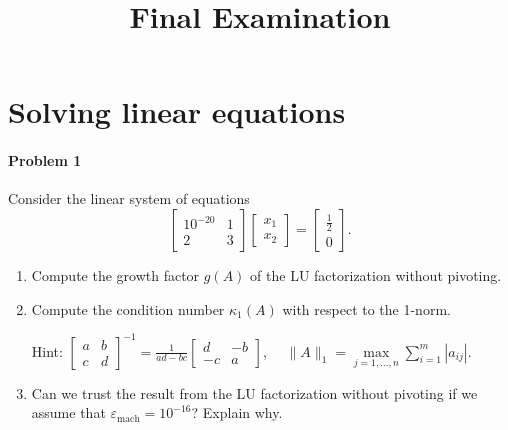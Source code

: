 

\usepackage{algpseudocode}

\title{Final Examination}

\newtheorem{algorithm}{Algorithm}


\maketitle

\section*{Solving linear equations}

\paragraph{Problem 1}
Consider the linear system of equations
\begin{equation*}
 \begin{bmatrix}
  10^{-20} & 1\\
  2 & 3
 \end{bmatrix}
 \begin{bmatrix}
  x_1\\x_2
 \end{bmatrix}
=\begin{bmatrix}
  \frac{1}{2}\\0
 \end{bmatrix}.
\end{equation*}
\begin{enumerate}
 \item Compute the growth factor $g(A)$ of the LU factorization without
   pivoting.
 \item Compute the condition number $\kappa_1(A)$ with respect to the
   1-norm.

 Hint: $\begin{bmatrix}
         a&b\\
         c&d
        \end{bmatrix}^{-1}=\frac{1}{ad-bc}\begin{bmatrix}
        d&-b\\
        -c&a
         \end{bmatrix} $, $\quad \|A\|_1=\max\limits_{j=1,\dots,n}\sum\limits_{i=1}^m|a_{ij}|$.
       \item Can we trust the result from the LU factorization without
         pivoting if we assume that $\varepsilon_{\text{mach}}=10^{-16}$?
         Explain why.
\end{enumerate}

